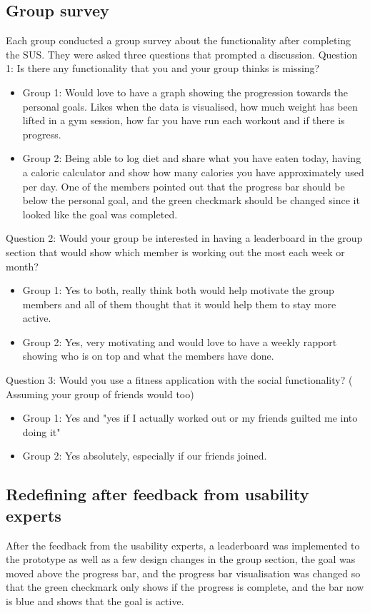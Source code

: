 \subsection{Group survey}
Each group conducted a group survey about the functionality after completing the SUS. They were asked three questions that prompted a discussion. 
Question 1: Is there any functionality that you and your group thinks is missing?
\begin{itemize}
    \item Group 1: Would love to have a graph showing the progression towards the personal goals.
    Likes when the data is visualised, how much weight has been lifted in a gym session, how far you have run each workout and if there is progress.
    \item Group 2: Being able to log diet and share what you have eaten today, having a caloric calculator and show how many calories you have approximately used per day. One of the members pointed out that the progress bar should be below the personal goal, and the green checkmark should be changed since it looked like the goal was completed.
\end{itemize}

Question 2: Would your group be interested in having a leaderboard in the group section that would show which member is working out the most each week or month?
\begin{itemize}
    \item Group 1: Yes to both, really think both would help motivate the group members and all of them thought that it would help them to stay more active.
    \item Group 2: Yes, very motivating and would love to have a weekly rapport showing who is on top and what the members have done.
\end{itemize}

Question 3: Would you use a fitness application with the social functionality? ( Assuming your group of friends would too)
\begin{itemize}
    \item Group 1: Yes and "yes if I actually worked out or my friends guilted me into doing it"
    \item Group 2: Yes absolutely, especially if our friends joined.
\end{itemize}


\subsection{Redefining after feedback from usability experts}
After the feedback from the usability experts, a leaderboard was implemented to the prototype as well as a few design changes in the group section, the goal was moved above the progress bar, and the progress bar visualisation was changed so that the green checkmark only shows if the progress is complete, and the bar now is blue and shows that the goal is active.

